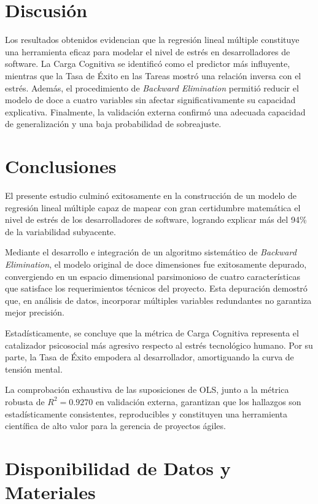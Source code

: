 \documentclass[procedia]{easychair}
\begin{document}
\section{Discusión}

Los resultados obtenidos evidencian que la regresión lineal
múltiple constituye una herramienta eficaz para modelar el
nivel de estrés en desarrolladores de software. La Carga
Cognitiva se identificó como el predictor más influyente,
mientras que la Tasa de Éxito en las Tareas mostró una
relación inversa con el estrés. Además, el procedimiento de
\textit{Backward Elimination} permitió reducir el modelo de
doce a cuatro variables sin afectar significativamente su
capacidad explicativa. Finalmente, la validación externa
confirmó una adecuada capacidad de generalización y una baja
probabilidad de sobreajuste.

\section{Conclusiones}

El presente estudio culminó exitosamente en la construcción de un modelo de regresión lineal múltiple capaz de mapear con gran certidumbre matemática el nivel de estrés de los desarrolladores de software, logrando explicar más del 94\% de la variabilidad subyacente. 

Mediante el desarrollo e integración de un algoritmo sistemático de \textit{Backward Elimination}, el modelo original de doce dimensiones fue exitosamente depurado, convergiendo en un espacio dimensional parsimonioso de cuatro características que satisface los requerimientos técnicos del proyecto. Esta depuración demostró que, en análisis de datos, incorporar múltiples variables redundantes no garantiza mejor precisión.

Estadísticamente, se concluye que la métrica de Carga Cognitiva representa el catalizador psicosocial más agresivo respecto al estrés tecnológico humano. Por su parte, la Tasa de Éxito empodera al desarrollador, amortiguando la curva de tensión mental. 

La comprobación exhaustiva de las suposiciones de OLS, junto a la métrica robusta de $R^2 = 0.9270$ en validación externa, garantizan que los hallazgos son estadísticamente consistentes, reproducibles y constituyen una herramienta científica de alto valor para la gerencia de proyectos ágiles.

\section*{Disponibilidad de Datos y Materiales}
\end{document}
